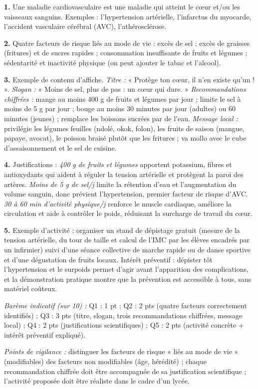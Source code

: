 \documentclass[11pt]{article}
\begin{document}
\begin{corrige}
\textbf{1.} Une maladie cardiovasculaire est une maladie qui atteint le cœur et/ou les vaisseaux sanguins. Exemples : l'hypertension artérielle, l'infarctus du myocarde, l'accident vasculaire cérébral (AVC), l'athérosclérose.

\textbf{2.} Quatre facteurs de risque liés au mode de vie : excès de sel ; excès de graisses (fritures) et de sucres rapides ; consommation insuffisante de fruits et légumes ; sédentarité et inactivité physique (on peut ajouter le tabac et l'alcool).

\textbf{3.} Exemple de contenu d'affiche. \emph{Titre :} « Protège ton cœur, il n'en existe qu'un ! ». \emph{Slogan :} « Moins de sel, plus de pas : un cœur qui dure. » \emph{Recommandations chiffrées :} mange au moins 400 g de fruits et légumes par jour ; limite le sel à moins de 5 g par jour ; bouge au moins 30 minutes par jour (adultes) ou 60 minutes (jeunes) ; remplace les boissons sucrées par de l'eau. \emph{Message local :} privilégie les légumes feuilles (ndolé, okok, folon), les fruits de saison (mangue, papaye, avocat), le poisson braisé plutôt que les fritures ; va mollo avec le cube d'assaisonnement et le sel de cuisine.

\textbf{4.} Justifications : \emph{400 g de fruits et légumes} apportent potassium, fibres et antioxydants qui aident à réguler la tension artérielle et protègent la paroi des artères. \emph{Moins de 5 g de sel/j} limite la rétention d'eau et l'augmentation du volume sanguin, donc prévient l'hypertension, premier facteur de risque d'AVC. \emph{30 à 60 min d'activité physique/j} renforce le muscle cardiaque, améliore la circulation et aide à contrôler le poids, réduisant la surcharge de travail du cœur.

\textbf{5.} Exemple d'activité : organiser un stand de dépistage gratuit (mesure de la tension artérielle, du tour de taille et calcul de l'IMC par les élèves encadrés par un infirmier) suivi d'une séance collective de marche rapide ou de danse sportive et d'une dégustation de fruits locaux. Intérêt préventif : dépister tôt l'hypertension et le surpoids permet d'agir avant l'apparition des complications, et la démonstration pratique montre que la prévention est accessible à tous, sans matériel coûteux.

\emph{Barème indicatif (sur 10) :} Q1 : 1 pt ; Q2 : 2 pts (quatre facteurs correctement identifiés) ; Q3 : 3 pts (titre, slogan, trois recommandations chiffrées, message local) ; Q4 : 2 pts (justifications scientifiques) ; Q5 : 2 pts (activité concrète + intérêt préventif expliqué).

\emph{Points de vigilance :} distinguer les facteurs de risque « liés au mode de vie » (modifiables) des facteurs non modifiables (âge, hérédité) ; chaque recommandation chiffrée doit être accompagnée de sa justification scientifique ; l'activité proposée doit être réaliste dans le cadre d'un lycée.
\end{corrige}
\end{document}
